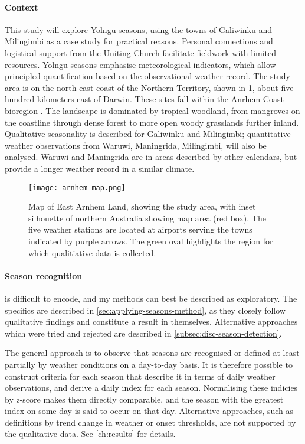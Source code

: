 \paragraph{Context}

This study will explore Yolngu seasons, using the towns of Galiwinku and
Milingimbi as a case study for practical reasons.  Personal connections and
logistical support from the Uniting Church facilitate fieldwork with limited
resources.  Yolngu seasons emphasise meteorological indicators, which allow
principled quantification based on the observational weather record.
%
The study area is on the north-east coast of the Northern Territory, shown
in  \cref{fig:arnhem-map}, about five hundred kilometers east of Darwin.
These sites fall within the Anrhem Coast bioregion \citep{ens2014}.
The landscape is dominated by tropical woodland, from mangroves on the
coastline through dense forest to more open woody grasslands further inland.
Qualitative seasonality is described for Galiwinku and Milingimbi;
quantitative weather observations from Waruwi, Maningrida, Milingimbi,
will also be analysed.  Waruwi and Maningrida are in areas described by
other calendars, but provide a longer weather record in a similar climate.

\begin{figure}[h]
    \centering
    \texttt{[image: arnhem-map.png]}
    \caption[Map of East Arnhem Land, showing the study area]{
        Map of East Arnhem Land, showing the study area, with inset silhouette
        of northern Australia showing map area (red box).  The five weather
        stations are located at airports serving the towns indicated by purple
        arrows.  The green oval highlights the region for which qualitiative
        data is collected.}
    \label{fig:arnhem-map}
\end{figure}



\paragraph{Season recognition} is difficult to encode, and my methods can
best be described as exploratory.  The specifics are described in
\cref{sec:applying-seasons-method}, as they closely follow qualitative
findings and constitute a result in themselves.  Alternative approaches
which were tried and rejected are described in \cref{subsec:disc-season-detection}.

The general approach is to observe that seasons are recognised or defined
at least partially by weather conditions on a day-to-day basis.  It is
therefore possible to construct criteria for each season that describe
it in terms of daily weather observations, and derive a daily index for
each season.  Normalising these indicies by z-score makes them directly
comparable, and the season with the greatest index on some day is said
to occur on that day.
%
Alternative approaches, such as definitions by trend change in weather
or onset thresholds, are not supported by the qualitative data.  See
\cref{ch:results} for details.


